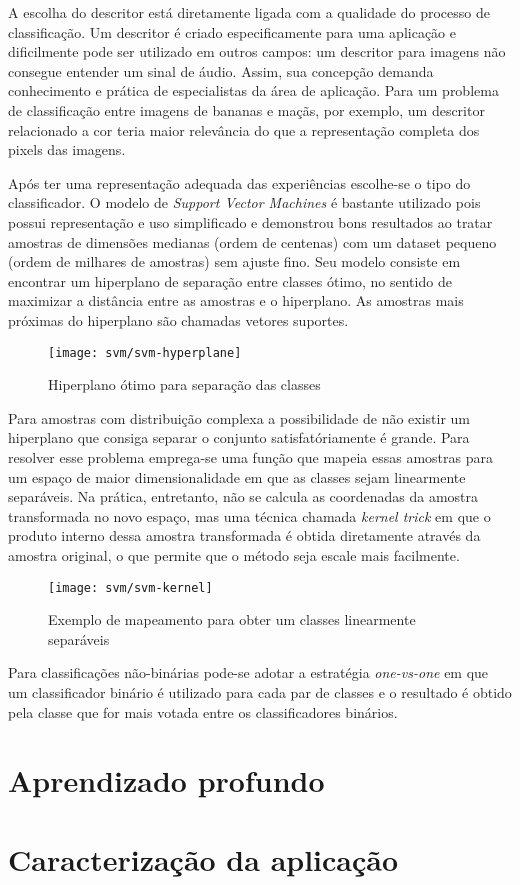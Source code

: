 A escolha do descritor está diretamente ligada com a qualidade do processo de classificação. Um descritor é criado especificamente para uma aplicação e dificilmente pode ser utilizado em outros campos: um descritor para imagens não consegue entender um sinal de áudio. Assim, sua concepção demanda conhecimento e prática de especialistas da área de aplicação. Para um problema de classificação entre imagens de bananas e maçãs, por exemplo, um descritor relacionado a cor teria maior relevância do que a representação completa dos pixels das imagens.

Após ter uma representação adequada das experiências escolhe-se o tipo do classificador. O modelo de \textit{Support Vector Machines} é bastante utilizado pois possui representação e uso simplificado e demonstrou bons resultados ao tratar amostras de dimensões medianas (ordem de centenas) com um dataset pequeno (ordem de milhares de amostras) sem ajuste fino. Seu modelo consiste em encontrar um hiperplano de separação entre classes ótimo, no sentido de maximizar a distância entre as amostras e o hiperplano. As amostras mais próximas do hiperplano são chamadas vetores suportes.

\begin{figure}[h]
\caption{Hiperplano ótimo para separação das classes}
\centering
\texttt{[image: svm/svm-hyperplane]}
\label{fig:svm-hyperplane}
\end{figure}

Para amostras com distribuição complexa a possibilidade de não existir um hiperplano que consiga separar o conjunto satisfatóriamente é grande. Para resolver esse problema emprega-se uma função que mapeia essas amostras para um espaço de maior dimensionalidade em que as classes sejam linearmente separáveis. Na prática, entretanto, não se calcula as coordenadas da amostra transformada no novo espaço, mas uma técnica chamada \textit{kernel trick} em que o produto interno dessa amostra transformada é obtida diretamente através da amostra original, o que permite que o método seja escale mais facilmente.

\begin{figure}[h]
\caption{Exemplo de mapeamento para obter um classes linearmente separáveis}
\centering
\texttt{[image: svm/svm-kernel]}
\label{fig:svm-kernel}
\end{figure}

Para classificações não-binárias pode-se adotar a estratégia \textit{one-vs-one} em que um classificador binário é utilizado para cada par de classes e o resultado é obtido pela classe que for mais votada entre os classificadores binários.

\section{Aprendizado profundo}
\section{Caracterização da aplicação}

